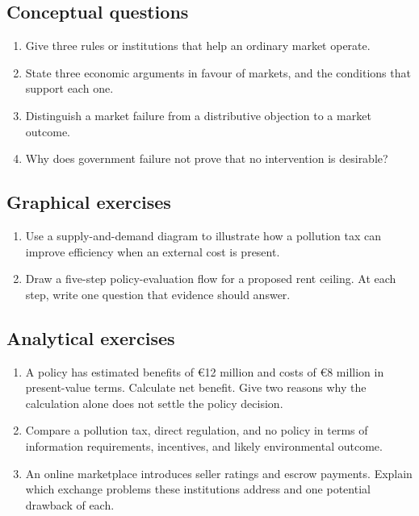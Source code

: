 \subsection*{Conceptual questions}
\begin{enumerate}[label=\arabic*.]
  \item Give three rules or institutions that help an ordinary market operate.
  \item State three economic arguments in favour of markets, and the conditions that support each one.
  \item Distinguish a market failure from a distributive objection to a market outcome.
  \item Why does government failure not prove that no intervention is desirable?
\end{enumerate}

\subsection*{Graphical exercises}
\begin{enumerate}[resume,label=\arabic*.]
  \item Use a supply-and-demand diagram to illustrate how a pollution tax can improve efficiency when an external cost is present.
  \item Draw a five-step policy-evaluation flow for a proposed rent ceiling. At each step, write one question that evidence should answer.
\end{enumerate}

\subsection*{Analytical exercises}
\begin{enumerate}[resume,label=\arabic*.]
  \item A policy has estimated benefits of \euro12 million and costs of \euro8 million in present-value terms. Calculate net benefit. Give two reasons why the calculation alone does not settle the policy decision.
  \item Compare a pollution tax, direct regulation, and no policy in terms of information requirements, incentives, and likely environmental outcome.
  \item An online marketplace introduces seller ratings and escrow payments. Explain which exchange problems these institutions address and one potential drawback of each.
\end{enumerate}

